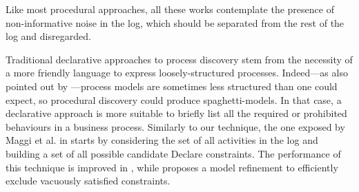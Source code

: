 Like most procedural approaches, all these works contemplate the presence of non-informative noise in the log, which should be separated from the rest of the log and disregarded.
 
Traditional declarative approaches to process discovery stem from the necessity of a more friendly language to express loosely-structured processes. Indeed---as also pointed out by \cite{2012-Maggi}---process models are sometimes less structured than one could expect, so procedural discovery could produce spaghetti-models. In that case, a declarative approach is more suitable to briefly list all the required or prohibited behaviours in a business process.
Similarly to our technique, the one exposed by Maggi et al. in \cite{2011-Maggi} starts by considering the set of all activities in the log and building a set of all possible candidate Declare constraints. 
%
The performance of this technique is improved in \cite{2012-Maggi}, 
while \cite{2012-Schunselaar} proposes a model refinement to efficiently exclude vacuously satisfied constraints. 

